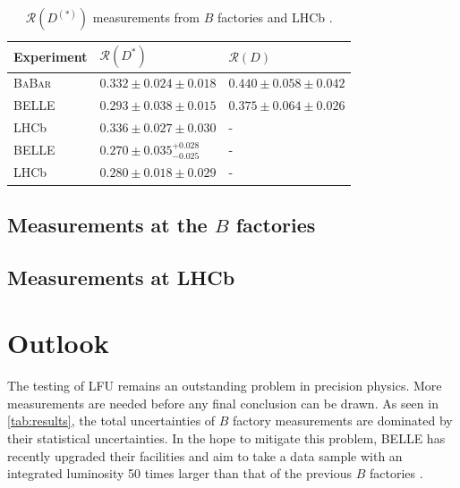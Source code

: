 \documentclass[12pt,letterpaper]{article}
\def\BaBar/{\textsc{BaBar}}
\def\RD/{\ensuremath{\mathcal{R}(D)}}
\def\RDst/{\ensuremath{\mathcal{R}(D^{*})}}
\def\RDDst/{\ensuremath{\mathcal{R}(D^{(*)})}}
\begin{document}
\begin{table}[ht]
    \centering
    \caption{
        \RDDst/ measurements from $B$ factories and LHCb \cite{HFLAV:2019}.
    }
    \label{tab:results}
    \begin{tabular}{lll}
        \toprule
        Experiment  &  \RDst/                               &  \RD/                         \\
        \midrule
        \BaBar/     &  $0.332 \pm 0.024 \pm 0.018$          &  $0.440 \pm 0.058 \pm 0.042$  \\
        BELLE       &  $0.293 \pm 0.038 \pm 0.015$          &  $0.375 \pm 0.064 \pm 0.026$  \\
        LHCb        &  $0.336 \pm 0.027 \pm 0.030$          &  -                            \\
        BELLE       &  $0.270 \pm 0.035^{+0.028}_{-0.025}$  &  -                            \\
        LHCb        &  $0.280 \pm 0.018 \pm 0.029$          &  -                            \\
        \bottomrule
    \end{tabular}
\end{table}

\subsection{Measurements at the $B$ factories} \label{sec:meas_bfactories}


\subsection{Measurements at LHCb} \label{sec:meas_lhcb}


\section{Outlook}
The testing of LFU remains an outstanding problem in precision
physics.
More measurements are needed before any final conclusion can be drawn.
As seen in \autoref{tab:results}, the total uncertainties of $B$ factory measurements are dominated by their statistical uncertainties.
In the hope to mitigate this problem, BELLE has recently upgraded their facilities and
aim to take a data sample with an integrated luminosity 50 times larger than that of the previous $B$ 
factories \cite{Abe:2010gxa}.
\end{document}
